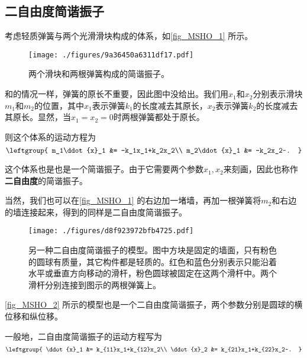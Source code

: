 

\subsection{二自由度简谐振子}

考虑轻质弹簧与两个光滑滑块构成的体系，如\autoref{fig_MSHO_1} 所示。

\begin{figure}[ht]
\centering
\texttt{[image: ./figures/9a36450a6311df17.pdf]}
\caption{两个滑块和两根弹簧构成的简谐振子。} \label{fig_MSHO_1}
\end{figure}

和的情况一样，弹簧的原长不重要，因此图中没给出。我们用$x_1$和$x_2$分别表示滑块$m_1$和$m_2$的位置，其中$x_1$表示弹簧$k_1$的长度减去其原长，$x_2$表示弹簧$k_2$的长度减去其原长。显然，当$x_1=x_2=0$时两根弹簧都处于原长。

则这个体系的运动方程为
\begin{equation}
\leftgroup{
    m_1\ddot{x}_1 &= -k_1x_1+k_2x_2\\
    m_2\ddot{x}_1 &= -k_2x_2~.
}
\end{equation}

这个体系也是也是一个简谐振子。由于它需要两个参数$x_1, x_2$来刻画，因此也称作\textbf{二自由度}的简谐振子。

当然，我们也可以在\autoref{fig_MSHO_1} 的右边加一堵墙，再加一根弹簧将$m_2$和右边的墙连接起来，得到的同样是二自由度简谐振子。


\begin{figure}[ht]
\centering
\texttt{[image: ./figures/d8f923972bfb4725.pdf]}
\caption{另一种二自由度简谐振子的模型。图中方块是固定的墙面，只有粉色的圆球有质量，其它构件都是轻质的。红色和蓝色分别表示只能沿着水平或垂直方向移动的滑杆，粉色圆球被固定在这两个滑杆中。两个滑杆分别连接到图示的两根弹簧上。} \label{fig_MSHO_2}
\end{figure}

\autoref{fig_MSHO_2} 所示的模型也是一个二自由度简谐振子，两个参数分别是圆球的横位移和纵位移。

一般地，二自由度简谐振子的运动方程写为
\begin{equation}\label{eq_MSHO_1}
\leftgroup{
    \ddot{x}_1 &= k_{11}x_1+k_{12}x_2\\
    \ddot{x}_2 &= k_{21}x_1+k_{22}x_2~.
}
\end{equation}


